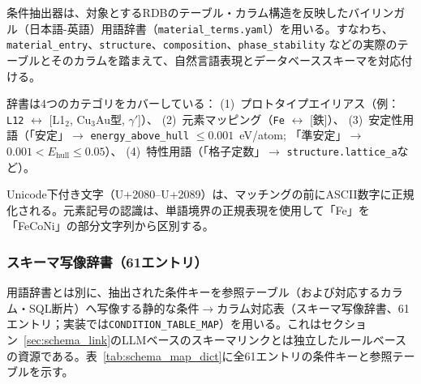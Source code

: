 \documentclass[twocolumn]{interact}
\begin{document}
条件抽出器は、対象とするRDBのテーブル・カラム構造を反映したバイリンガル（日本語-英語）用語辞書（\texttt{material\_terms.yaml}）を用いる。すなわち、\texttt{material\_entry}、\texttt{structure}、\texttt{composition}、\texttt{phase\_stability} などの実際のテーブルとそのカラムを踏まえて、自然言語表現とデータベーススキーマを対応付ける。

辞書は4つのカテゴリをカバーしている：
(1)~プロトタイプエイリアス（例：\texttt{L12} $\leftrightarrow$ [L1$_2$, Cu$_3$Au型, $\gamma'$]）、
(2)~元素マッピング（\texttt{Fe} $\leftrightarrow$ [鉄]）、
(3)~安定性用語（「安定」$\to$ \texttt{energy\_above\_hull} $\leq 0.001$~eV/atom; 「準安定」$\to$ $0.001 < E_\text{hull} \leq 0.05$）、
(4)~特性用語（「格子定数」$\to$ \texttt{structure.lattice\_a}など）。

Unicode下付き文字（U+2080--U+2089）は、マッチングの前にASCII数字に正規化される。元素記号の認識は、単語境界の正規表現を使用して「Fe」を「FeCoNi」の部分文字列から区別する。

\subsubsection{スキーマ写像辞書（61エントリ）}
\label{sec:sup_schema_map_dict}

用語辞書とは別に、抽出された条件キーを参照テーブル（および対応するカラム・SQL断片）へ写像する静的な条件$\to$カラム対応表（スキーマ写像辞書、61エントリ；実装では\texttt{CONDITION\_TABLE\_MAP}）を用いる。これはセクション~\ref{sec:schema_link}のLLMベースのスキーマリンクとは独立したルールベースの資源である。表~\ref{tab:schema_map_dict}に全61エントリの条件キーと参照テーブルを示す。
\end{document}
